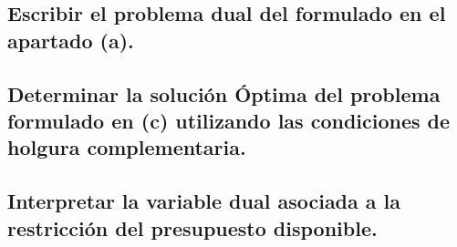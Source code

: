 \documentclass[10pt, a4paper]{article}
\begin{document}
		\subsection{Escribir el problema dual del formulado en el apartado (a).}

			\paragraph{}


		\subsection{Determinar la solución Óptima del problema formulado en (c) utilizando las condiciones de holgura complementaria.}

			\paragraph{}


		\subsection{Interpretar la variable dual asociada a la restricción del presupuesto disponible.}

			\paragraph{}
\end{document}
